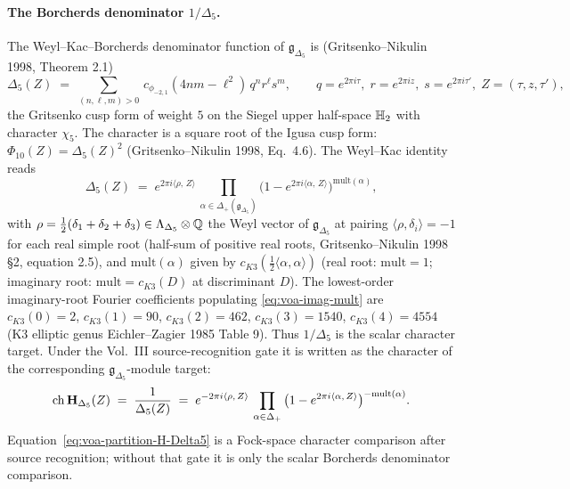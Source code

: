 \paragraph{The Borcherds denominator $1/\Delta_5$.}
The Weyl--Kac--Borcherds denominator function of $\mathfrak g_{\Delta_5}$
is (Gritsenko--Nikulin 1998, Theorem 2.1)
\begin{equation}
\label{eq:voa-GN-denom}
  \Delta_5(Z) \;=\; \sum_{(n,\ell,m) > 0}\,c_{\phi_{-2,1}}(4nm - \ell^2)\,q^n r^\ell s^m,
  \qquad q = e^{2\pi i\tau},\;r = e^{2\pi i z},\;s = e^{2\pi i\tau'},\; Z = (\tau,z,\tau'),
\end{equation}
the Gritsenko cusp form of weight $5$ on the Siegel upper half-space
$\mathbb{H}_2$ with character $\chi_5$. The character is a square root of
the Igusa cusp form: $\Phi_{10}(Z) = \Delta_5(Z)^2$ (Gritsenko--Nikulin 1998,
Eq.~4.6). The Weyl--Kac identity reads
\begin{equation}
\label{eq:voa-WKB-denom}
  \Delta_5(Z) \;=\; e^{2\pi i\langle \rho,\, Z\rangle}\,
  \prod_{\alpha \in \Delta_+(\mathfrak g_{\Delta_5})}
  \bigl(1 - e^{2\pi i\langle\alpha,\,Z\rangle}\bigr)^{\mathrm{mult}(\alpha)},
\end{equation}
with $\rho = \tfrac{1}{2}(\delta_1 + \delta_2 + \delta_3) \in
\Lambda_{\Delta_5}\otimes\mathbb{Q}$ the Weyl vector of $\mathfrak g_{\Delta_5}$
at pairing $\langle\rho,\delta_i\rangle = -1$ for each real simple
root (half-sum of positive real roots, Gritsenko--Nikulin 1998
\S2, equation 2.5), and $\mathrm{mult}(\alpha)$ given by
$c_{K3}(\tfrac{1}{2}\langle\alpha,\alpha\rangle)$ (real root:
$\mathrm{mult} = 1$; imaginary root:
$\mathrm{mult} = c_{K3}(D)$ at discriminant $D$). The lowest-order
imaginary-root Fourier coefficients populating \eqref{eq:voa-imag-mult}
are $c_{K3}(0) = 2$, $c_{K3}(1) = 90$, $c_{K3}(2) = 462$,
$c_{K3}(3) = 1540$, $c_{K3}(4) = 4554$ (K3 elliptic genus
Eichler--Zagier 1985 Table 9). Thus $1/\Delta_5$ is the scalar
character target. Under the Vol.~III source-recognition gate it is
written as the character of the corresponding
$\mathfrak g_{\Delta_5}$-module target:
\begin{equation}
\label{eq:voa-partition-H-Delta5}
  \mathrm{ch}\,\mathbf{H}_{\Delta_5}(Z) \;=\; \frac{1}{\Delta_5(Z)}
  \;=\; e^{-2\pi i\langle\rho,\,Z\rangle}\,
  \prod_{\alpha\in\Delta_+}\,\bigl(1 - e^{2\pi i\langle\alpha,\,Z\rangle}\bigr)^{-\mathrm{mult}(\alpha)}.
\end{equation}
Equation~\eqref{eq:voa-partition-H-Delta5} is a Fock-space character
comparison after source recognition; without that gate it is only the
scalar Borcherds denominator comparison.

